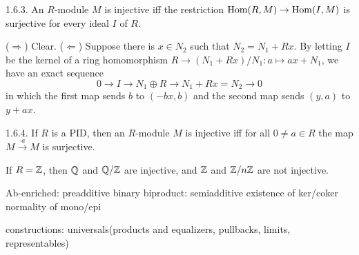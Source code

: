 \documentclass{../../small}
\begin{document}
\begin{prop*}1.6.3.
An $R$-module $M$ is injective iff the restriction $\operatorname{Hom}(R,M)\to\operatorname{Hom}(I,M)$ is surjective for every ideal $I$ of $R$.
\end{prop*}
\begin{pf}
($\Rightarrow$) Clear.
($\Leftarrow$) Suppose there is $x\in N_2$ such that $N_2=N_1+Rx$.
By letting $I$ be the kernel of a ring homomorphism $R\to(N_1+Rx)/N_1:a\mapsto ax+N_1$, we have an exact sequence
\[0\to I\to N_1\oplus R\to N_1+Rx=N_2\to0\]
in which the first map sends $b$ to $(-bx,b)$ and the second map sends $(y,a)$ to $y+ax$.

\end{pf}

\begin{rmk*}1.6.4.
If $R$ is a PID, then an $R$-module $M$ is injective iff for all $0\ne a\in R$ the map $M\xrightarrow{\cdot a}M$ is surjective.
\end{rmk*}
\begin{pf}

\end{pf}

\begin{ex*}
If $R=\mathbb{Z}$, then $\mathbb{Q}$ and $\mathbb{Q}/\mathbb{Z}$ are injective, and $\mathbb{Z}$ and $\mathbb{Z}/n\mathbb{Z}$ are not injective.
\end{ex*}



Ab-enriched: preadditive
binary biproduct: semiadditive
existence of ker/coker
normality of mono/epi

constructions: universals(products and equalizers, pullbacks, limits, representables)
\end{document}
